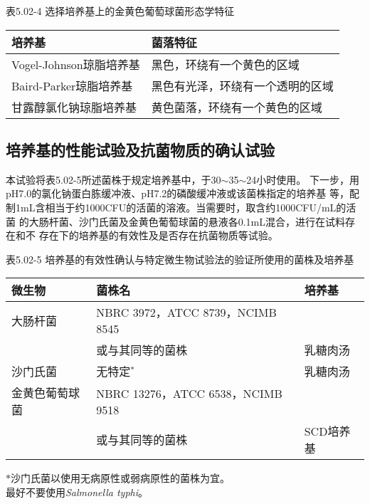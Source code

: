 \documentclass[11pt,a4paper]{article}
\newenvironment{SC}{%
  \CJKfamily{gbsn}%
  \CJKtilde
  \CJKnospace}{}
\begin{document}
\begin{CJK}{UTF8}{}
\begin{SC}
\begin{table}[htb]
\begin{center}
表5.02-4 选择培养基上的金黄色葡萄球菌形态学特征\\
\begin{tabular}{l|l}
\hline
培养基&菌落特征\\
\hline
Vogel-Johnson琼脂培养基&黑色，环绕有一个黄色的区域\\
\hline
Baird-Parker琼脂培养基&黑色有光泽，环绕有一个透明的区域\\
\hline
甘露醇氯化钠琼脂培养基&黄色菌落，环绕有一个黄色的区域\\
\hline
\end{tabular}
\end{center}
\end{table}

\subsection*{培养基的性能试验及抗菌物质的确认试验}
本试验将表5.02-5所述菌株于规定培养基中，于30$\sim$35$\sim$24小时使用。
下一步，用pH7.0的氯化钠蛋白胨缓冲液、pH7.2的磷酸缓冲液或该菌株指定的培养基
等，配制1mL含相当于约1000CFU的活菌的溶液。当需要时，取含约1000CFU/mL的活菌
的大肠杆菌、沙门氏菌及金黄色葡萄球菌的悬液各0.1mL混合，进行在试料存在和不
存在下的培养基的有效性及是否存在抗菌物质等试验。\\
\begin{table}[htb]
\begin{center}
表5.02-5 培养基的有效性确认与特定微生物试验法的验证所使用的菌株及培养基\\
\begin{tabular}{l|p{3 in}|l}
\hline
微生物&菌株名&培养基\\
\hline
大肠杆菌&NBRC 3972，ATCC 8739，NCIMB 8545\\
&或与其同等的菌株&乳糖肉汤\\
\hline
沙门氏菌&无特定$^{\ast}$&乳糖肉汤\\
\hline
金黄色葡萄球菌&NBRC 13276，ATCC 6538，NCIMB 9518\\
&或与其同等的菌株&SCD培养基\\
\hline
\end{tabular}
\end{center}
$\ast$沙门氏菌以使用无病原性或弱病原性的菌株为宜。\\
最好不要使用\textsl{Salmonella typhi}。\\
\end{table}


\end{SC}
\end{CJK}
\end{document}
